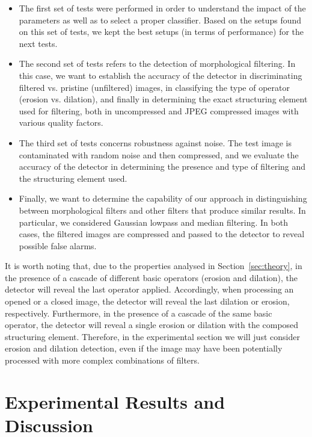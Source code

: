 \documentclass{ieeeaccess}
\begin{document}
\begin{itemize}
	\item The first set of tests were performed in order to understand the impact of the parameters as well as to select a proper classifier. Based on the setups found on this set of tests, we kept the best setups (in terms of performance) for the next tests.
	
	\item The second set of tests refers to the detection of morphological filtering. In this case, we want to establish the accuracy of the detector in discriminating filtered vs. pristine (unfiltered) images, in classifying the type of operator (erosion vs. dilation), and finally in determining the exact structuring element used for filtering, both in uncompressed and JPEG compressed images with various quality factors. 
	
	\item The third set of tests concerns robustness against noise. The test image is contaminated with random noise and then compressed, and we evaluate the accuracy of the detector in determining the presence and type of filtering and the structuring element used.
	
	\item Finally, we want to determine the capability of our approach in distinguishing between morphological filters and other filters that produce similar results. In particular, we considered Gaussian lowpass and median filtering. In both cases, the filtered images are compressed and passed to the detector to reveal possible false alarms.
	
\end{itemize}

It is worth noting that, due to the properties analysed in Section~\ref{sec:theory}, in the presence of a cascade of different basic operators (erosion and dilation), the detector will reveal the last operator applied. Accordingly, when processing an opened or a closed image, the detector will reveal the last dilation or erosion, respectively. Furthermore, in the presence of a cascade of the same basic operator, the detector will reveal a single erosion or dilation with the composed structuring element. Therefore, in the experimental section we will just consider erosion and dilation detection, even if the image may have been potentially processed with more complex combinations of filters.


\section{Experimental Results and Discussion}
\label{sec:experiments}
\end{document}
